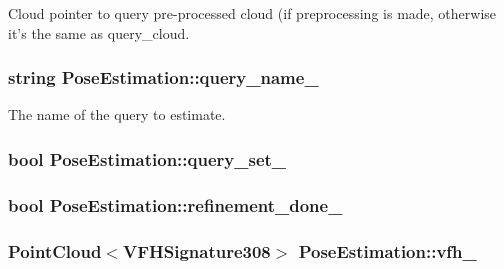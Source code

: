 Cloud pointer to query pre-\/processed cloud (if preprocessing is made, otherwise it's the same as query\-\_\-cloud. 

\hypertarget{classPoseEstimation_a5dd4cb5c1d202b2c1d5e874902dc31bf}{
\subsubsection[{query\-\_\-name\-\_\-}]{\setlength{\rightskip}{0pt plus 5cm}string Pose\-Estimation\-::query\-\_\-name\-\_\-\hspace{0.3cm}{\ttfamily [private]}}}\label{classPoseEstimation_a5dd4cb5c1d202b2c1d5e874902dc31bf}


The name of the query to estimate. 

\hypertarget{classPoseEstimation_a7e544a41181063a42466cab3bdaf7566}{
\subsubsection[{query\-\_\-set\-\_\-}]{\setlength{\rightskip}{0pt plus 5cm}bool Pose\-Estimation\-::query\-\_\-set\-\_\-\hspace{0.3cm}{\ttfamily [private]}}}\label{classPoseEstimation_a7e544a41181063a42466cab3bdaf7566}
\hypertarget{classPoseEstimation_a2a2d2fea36860191501e5b709df102cc}{
\subsubsection[{refinement\-\_\-done\-\_\-}]{\setlength{\rightskip}{0pt plus 5cm}bool Pose\-Estimation\-::refinement\-\_\-done\-\_\-\hspace{0.3cm}{\ttfamily [private]}}}\label{classPoseEstimation_a2a2d2fea36860191501e5b709df102cc}
\hypertarget{classPoseEstimation_aa5b8629653546950dfc66147f3df29a7}{
\subsubsection[{vfh\-\_\-}]{\setlength{\rightskip}{0pt plus 5cm}Point\-Cloud$<$V\-F\-H\-Signature308$>$ Pose\-Estimation\-::vfh\-\_\-\hspace{0.3cm}{\ttfamily [private]}}}\label{classPoseEstimation_aa5b8629653546950dfc66147f3df29a7}


